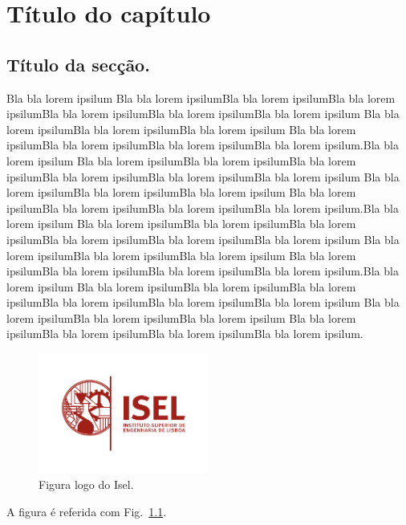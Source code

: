 \chapter{Título do capítulo}

\section{Título da secção.}\label{sec:sdh}

Bla bla lorem ipsilum Bla bla lorem ipsilumBla bla lorem ipsilumBla bla
lorem ipsilumBla bla lorem ipsilumBla bla lorem ipsilumBla bla lorem
ipsilum Bla bla lorem ipsilumBla bla lorem ipsilumBla bla lorem ipsilum
Bla bla lorem ipsilumBla bla lorem ipsilumBla bla lorem ipsilumBla bla
lorem ipsilum.Bla bla lorem ipsilum Bla bla lorem ipsilumBla bla lorem ipsilumBla bla
lorem ipsilumBla bla lorem ipsilumBla bla lorem ipsilumBla bla lorem
ipsilum Bla bla lorem ipsilumBla bla lorem ipsilumBla bla lorem ipsilum
Bla bla lorem ipsilumBla bla lorem ipsilumBla bla lorem ipsilumBla bla
lorem ipsilum.Bla bla lorem ipsilum Bla bla lorem ipsilumBla bla lorem ipsilumBla bla
lorem ipsilumBla bla lorem ipsilumBla bla lorem ipsilumBla bla lorem
ipsilum Bla bla lorem ipsilumBla bla lorem ipsilumBla bla lorem ipsilum
Bla bla lorem ipsilumBla bla lorem ipsilumBla bla lorem ipsilumBla bla
lorem ipsilum.Bla bla lorem ipsilum Bla bla lorem ipsilumBla bla lorem ipsilumBla bla
lorem ipsilumBla bla lorem ipsilumBla bla lorem ipsilumBla bla lorem
ipsilum Bla bla lorem ipsilumBla bla lorem ipsilumBla bla lorem ipsilum
Bla bla lorem ipsilumBla bla lorem ipsilumBla bla lorem ipsilumBla bla
lorem ipsilum.


\begin{figure}[!h]
  {\centering
    \includegraphics[width=0.5\textwidth]{chapter2/logo-isel}
    \caption{Figura logo do Isel.}\label{fig:figura}
   \par}
\end{figure}

A figura é referida com Fig.~\ref{fig:figura}.

